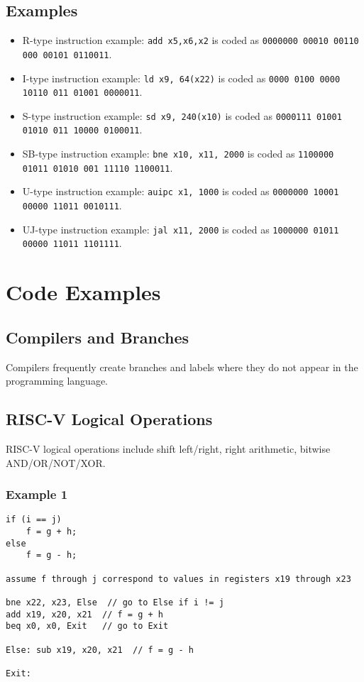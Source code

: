 \documentclass{article}
\begin{document}
\subsection*{Examples}
\begin{itemize}
    \item R-type instruction example: \texttt{add x5,x6,x2} is coded as \texttt{0000000 00010 00110 000 00101 0110011}.
    \item I-type instruction example: \texttt{ld x9, 64(x22)} is coded as \texttt{0000 0100 0000 10110 011 01001 0000011}.
    \item S-type instruction example: \texttt{sd x9, 240(x10)} is coded as \texttt{0000111 01001 01010 011 10000 0100011}.
    \item SB-type instruction example: \texttt{bne x10, x11, 2000} is coded as \texttt{1100000 01011 01010 001 11110 1100011}.
    \item U-type instruction example: \texttt{auipc x1, 1000} is coded as \texttt{0000000 10001 00000 11011 0010111}.
    \item UJ-type instruction example: \texttt{jal x11, 2000} is coded as \texttt{1000000 01011 00000 11011 1101111}.
\end{itemize}

\section{Code Examples}

\subsection{Compilers and Branches}
Compilers frequently create branches and labels where they do not appear in the programming language.

\subsection{RISC-V Logical Operations}
RISC-V logical operations include shift left/right, right arithmetic, bitwise AND/OR/NOT/XOR.

\subsubsection{Example 1}
\begin{verbatim}
if (i == j)
    f = g + h;
else
    f = g - h;

assume f through j correspond to values in registers x19 through x23

bne x22, x23, Else  // go to Else if i != j
add x19, x20, x21  // f = g + h
beq x0, x0, Exit   // go to Exit

Else: sub x19, x20, x21  // f = g - h

Exit:
\end{verbatim}
\end{document}
